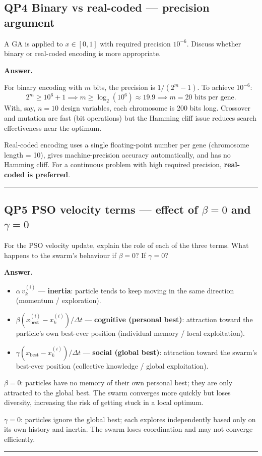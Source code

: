 \documentclass[11pt,a4paper]{article}
\newcommand{\Q}[2]{\subsection*{Q#1 \quad #2}}
\newenvironment{answer}{\medskip\textbf{Answer.}\par}{\bigskip\hrule\bigskip}
\begin{document}
\Q{P4}{[3 marks] Binary vs real-coded — precision argument}
A GA is applied to $x \in [0,1]$ with required precision $10^{-6}$.
Discuss whether binary or real-coded encoding is more appropriate.

\begin{answer}
For binary encoding with $m$ bits, the precision is $1/(2^m - 1)$.
To achieve $10^{-6}$:
\[
  2^m \geq 10^6 + 1 \implies m \geq \log_2(10^6) \approx 19.9
  \implies m = 20 \text{ bits per gene.}
\]
With, say, $n = 10$ design variables, each chromosome is 200 bits long.
Crossover and mutation are fast (bit operations) but the Hamming cliff
issue reduces search effectiveness near the optimum.

Real-coded encoding uses a single floating-point number per gene
(chromosome length = 10), gives machine-precision accuracy automatically,
and has no Hamming cliff.  For a continuous problem with high required
precision, \textbf{real-coded is preferred}.
\end{answer}


\Q{P5}{[4 marks] PSO velocity terms — effect of $\beta=0$ and $\gamma=0$}
For the PSO velocity update, explain the role of each of the three terms.
What happens to the swarm's behaviour if $\beta = 0$?  If $\gamma = 0$?

\begin{answer}
\begin{itemize}[leftmargin=*]
  \item $\alpha\,v^{(i)}_k$ — \textbf{inertia}: particle tends to keep
        moving in the same direction (momentum / exploration).
  \item $\beta(x^{(i)}_\text{best} - x^{(i)}_k)/\Delta t$ —
        \textbf{cognitive (personal best)}: attraction toward the particle's
        own best-ever position (individual memory / local exploitation).
  \item $\gamma(x_\text{best} - x^{(i)}_k)/\Delta t$ —
        \textbf{social (global best)}: attraction toward the swarm's
        best-ever position (collective knowledge / global exploitation).
\end{itemize}

$\beta = 0$: particles have no memory of their own personal best; they
are only attracted to the global best.  The swarm converges more quickly
but loses diversity, increasing the risk of getting stuck in a local optimum.

$\gamma = 0$: particles ignore the global best; each explores independently
based only on its own history and inertia.  The swarm loses coordination
and may not converge efficiently.
\end{answer}
\end{document}
